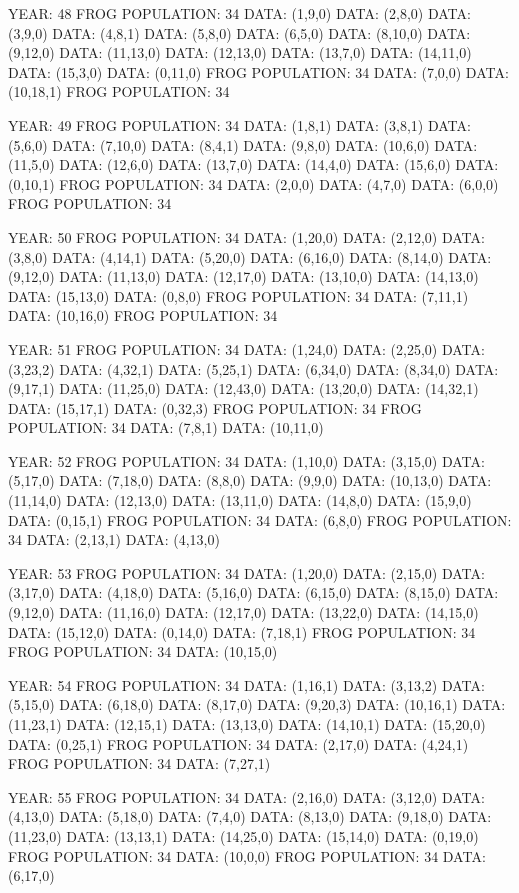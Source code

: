 \documentclass[12pt,a4paper]{article}
\begin{document}
{YEAR: 48
FROG POPULATION: 34
DATA: (1,9,0)
DATA: (2,8,0)
DATA: (3,9,0)
DATA: (4,8,1)
DATA: (5,8,0)
DATA: (6,5,0)
DATA: (8,10,0)
DATA: (9,12,0)
DATA: (11,13,0)
DATA: (12,13,0)
DATA: (13,7,0)
DATA: (14,11,0)
DATA: (15,3,0)
DATA: (0,11,0)
FROG POPULATION: 34
DATA: (7,0,0)
DATA: (10,18,1)
FROG POPULATION: 34

YEAR: 49
FROG POPULATION: 34
DATA: (1,8,1)
DATA: (3,8,1)
DATA: (5,6,0)
DATA: (7,10,0)
DATA: (8,4,1)
DATA: (9,8,0)
DATA: (10,6,0)
DATA: (11,5,0)
DATA: (12,6,0)
DATA: (13,7,0)
DATA: (14,4,0)
DATA: (15,6,0)
DATA: (0,10,1)
FROG POPULATION: 34
DATA: (2,0,0)
DATA: (4,7,0)
DATA: (6,0,0)
FROG POPULATION: 34

YEAR: 50
FROG POPULATION: 34
DATA: (1,20,0)
DATA: (2,12,0)
DATA: (3,8,0)
DATA: (4,14,1)
DATA: (5,20,0)
DATA: (6,16,0)
DATA: (8,14,0)
DATA: (9,12,0)
DATA: (11,13,0)
DATA: (12,17,0)
DATA: (13,10,0)
DATA: (14,13,0)
DATA: (15,13,0)
DATA: (0,8,0)
FROG POPULATION: 34
DATA: (7,11,1)
DATA: (10,16,0)
FROG POPULATION: 34

YEAR: 51
FROG POPULATION: 34
DATA: (1,24,0)
DATA: (2,25,0)
DATA: (3,23,2)
DATA: (4,32,1)
DATA: (5,25,1)
DATA: (6,34,0)
DATA: (8,34,0)
DATA: (9,17,1)
DATA: (11,25,0)
DATA: (12,43,0)
DATA: (13,20,0)
DATA: (14,32,1)
DATA: (15,17,1)
DATA: (0,32,3)
FROG POPULATION: 34
FROG POPULATION: 34
DATA: (7,8,1)
DATA: (10,11,0)

YEAR: 52
FROG POPULATION: 34
DATA: (1,10,0)
DATA: (3,15,0)
DATA: (5,17,0)
DATA: (7,18,0)
DATA: (8,8,0)
DATA: (9,9,0)
DATA: (10,13,0)
DATA: (11,14,0)
DATA: (12,13,0)
DATA: (13,11,0)
DATA: (14,8,0)
DATA: (15,9,0)
DATA: (0,15,1)
FROG POPULATION: 34
DATA: (6,8,0)
FROG POPULATION: 34
DATA: (2,13,1)
DATA: (4,13,0)

YEAR: 53
FROG POPULATION: 34
DATA: (1,20,0)
DATA: (2,15,0)
DATA: (3,17,0)
DATA: (4,18,0)
DATA: (5,16,0)
DATA: (6,15,0)
DATA: (8,15,0)
DATA: (9,12,0)
DATA: (11,16,0)
DATA: (12,17,0)
DATA: (13,22,0)
DATA: (14,15,0)
DATA: (15,12,0)
DATA: (0,14,0)
DATA: (7,18,1)
FROG POPULATION: 34
FROG POPULATION: 34
DATA: (10,15,0)

YEAR: 54
FROG POPULATION: 34
DATA: (1,16,1)
DATA: (3,13,2)
DATA: (5,15,0)
DATA: (6,18,0)
DATA: (8,17,0)
DATA: (9,20,3)
DATA: (10,16,1)
DATA: (11,23,1)
DATA: (12,15,1)
DATA: (13,13,0)
DATA: (14,10,1)
DATA: (15,20,0)
DATA: (0,25,1)
FROG POPULATION: 34
DATA: (2,17,0)
DATA: (4,24,1)
FROG POPULATION: 34
DATA: (7,27,1)

YEAR: 55
FROG POPULATION: 34
DATA: (2,16,0)
DATA: (3,12,0)
DATA: (4,13,0)
DATA: (5,18,0)
DATA: (7,4,0)
DATA: (8,13,0)
DATA: (9,18,0)
DATA: (11,23,0)
DATA: (13,13,1)
DATA: (14,25,0)
DATA: (15,14,0)
DATA: (0,19,0)
FROG POPULATION: 34
DATA: (10,0,0)
FROG POPULATION: 34
DATA: (6,17,0)

}
\end{document}
